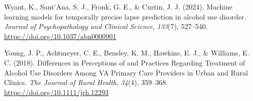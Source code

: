 \documentclass[
  letterpaper,
  DIV=11,
  numbers=noendperiod]{scrartcl}
\newlength{\cslhangindent}
\newenvironment{CSLReferences}[2] %
 {\begin{list}{}{%
  \setlength{\itemindent}{0pt}
  \setlength{\leftmargin}{0pt}
  \setlength{\parsep}{0pt}
  \ifodd #1
   \setlength{\leftmargin}{\cslhangindent}
   \setlength{\itemindent}{-1\cslhangindent}
  \fi
  \setlength{\itemsep}{#2\baselineskip}}}
 {\end{list}}
\begin{document}
\begin{CSLReferences}{1}{0}
Wyant, K., Sant'Ana, S. J., Fronk, G. E., \& Curtin, J. J. (2024).
Machine learning models for temporally precise lapse prediction in
alcohol use disorder. \emph{Journal of Psychopathology and Clinical
Science}, \emph{133}(7), 527--540.
\url{https://doi.org/10.1037/abn0000901}

Young, J. P., Achtmeyer, C. E., Bensley, K. M., Hawkins, E. J., \&
Williams, E. C. (2018). Differences in {Perceptions} of and {Practices
Regarding Treatment} of {Alcohol Use Disorders Among VA Primary Care
Providers} in {Urban} and {Rural Clinics}. \emph{The Journal of Rural
Health}, \emph{34}(4), 359--368. \url{https://doi.org/10.1111/jrh.12293}

\end{CSLReferences}
\end{document}
